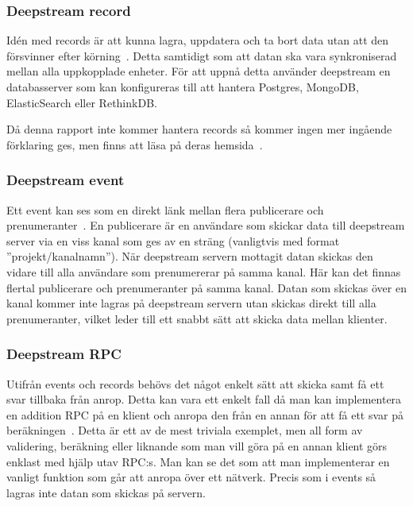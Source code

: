 \subsubsection{Deepstream record}
\label{subsec:tim-ds-record}
Idén med records är att kunna lagra, uppdatera och ta bort data utan att den försvinner efter körning~\cite{ds:record}. Detta samtidigt som att datan ska vara synkroniserad mellan alla uppkopplade enheter. För att uppnå detta använder deepstream en databasserver som kan konfigureras till att hantera Postgres, MongoDB, ElasticSearch eller RethinkDB. 

Då denna rapport inte kommer hantera records så kommer ingen mer ingående förklaring ges, men finns att läsa på deras hemsida~\cite{ds-storingdata}.

\subsubsection{Deepstream event}
\label{subsec:tim-ds-event}
Ett event kan ses som en direkt länk mellan flera publicerare och prenumeranter~\cite{ds:event}. En publicerare är en användare som skickar data till deepstream server via en viss kanal som ges av en sträng (vanligtvis med format ''projekt/kanalnamn''). När deepstream servern mottagit datan skickas den vidare till alla användare som prenumererar på samma kanal. Här kan det finnas flertal publicerare och prenumeranter på samma kanal. Datan som skickas över en kanal kommer inte lagras på deepstream servern utan skickas direkt till alla prenumeranter, vilket leder till ett snabbt sätt att skicka data mellan klienter.

\subsubsection{Deepstream RPC}
\label{subsec:tim-ds-rpc}
Utifrån events och records behövs det något enkelt sätt att skicka samt få ett svar tillbaka från anrop. Detta kan vara ett enkelt fall då man kan implementera en addition RPC på en klient och anropa den från en annan för att få ett svar på beräkningen~\cite{ds:rpc}. Detta är ett av de mest triviala exemplet, men all form av validering, beräkning eller liknande som man vill göra på en annan klient görs enklast med hjälp utav RPC:s. Man kan se det som att man implementerar en vanligt funktion som går att anropa över ett nätverk. Precis som i events så lagras inte datan som skickas på servern.

